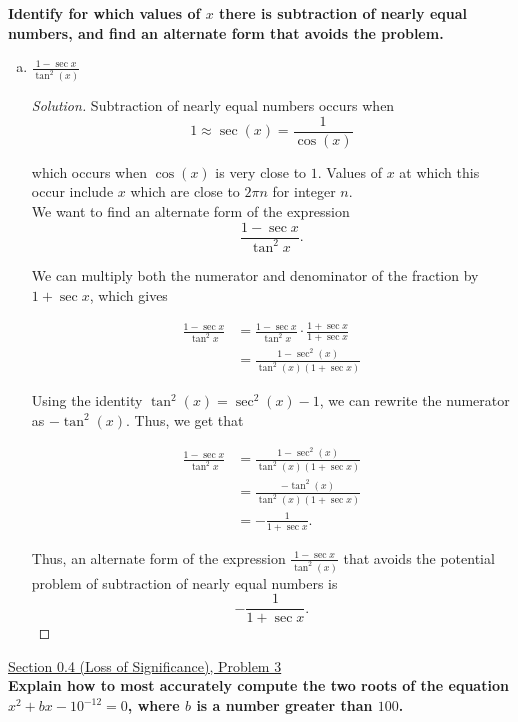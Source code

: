 \documentclass[11pt]{article}
\newenvironment{solution}
  {\renewcommand\qedsymbol{$\blacksquare$}\begin{proof}[Solution]}
  {\end{proof}}
\theoremstyle{definition}
\begin{document}
\textbf{Identify for which values of $x$ there is subtraction of nearly equal numbers, and find an alternate form that avoids the problem.} 
\begin{enumerate}[a)] 
    \item $\frac{1 - \sec{x}}{\tan^2(x)}$
\begin{solution}

Subtraction of nearly equal numbers occurs when \[1 \approx \sec(x) = \frac{1}{\cos(x)}\] 

which occurs when $\cos(x)$ is very close to $1$. Values of $x$ at which this occur include $x$ which are close to $2\pi n$ for integer $n$. \\

We want to find an alternate form of the expression \[ \frac{1 - \sec{x}}{\tan^2{x}}. \]

We can multiply both the numerator and denominator of the fraction by $1+\sec{x}$, which gives

\begin{align*}
    \frac{1 - \sec{x}}{\tan^2{x}} &= \frac{1-\sec{x}}{\tan^2{x}} \cdot \frac{1+\sec{x}}{1+\sec{x}} \\
    &= \frac{1 - \sec^2(x)}{\tan^2(x) (1 + \sec{x})}
\end{align*}

Using the identity $\tan^2(x) = \sec^2(x) - 1$, we can rewrite the numerator as $-\tan^2(x)$. Thus, we get that

\begin{align*}
    \frac{1 - \sec{x}}{\tan^2{x}} &= \frac{1 - \sec^2(x)}{\tan^2(x) (1 + \sec{x})} \\
    &= \frac{-\tan^2(x)}{\tan^2(x)(1+\sec x)} \\
    &= -\frac{1}{1+\sec{x}}.
\end{align*}

Thus, an alternate form of the expression $\frac{1 - \sec{x}}{\tan^2(x)}$ 
that avoids the potential problem of subtraction of nearly equal numbers is \[ \boxed{-\frac{1}{1+\sec{x}}} .\]
\end{solution}

\end{enumerate}

\newpage

\underline{Section 0.4 (Loss of Significance), Problem 3} \\

\textbf{Explain how to most accurately compute the two roots of the equation
$x^2+bx - 10^{-12} =0$, where $b$ is a number greater than $100$.}
\end{document}
